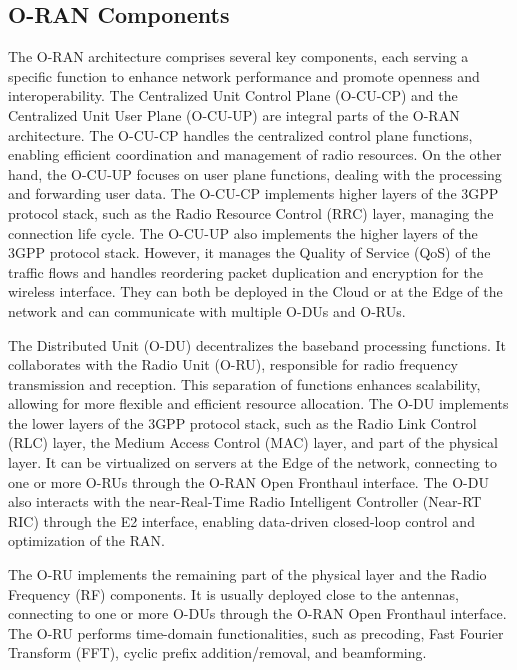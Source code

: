 \subsection{O-RAN Components}\label{sec:Components}
The O-RAN architecture comprises several key components, each serving a specific function to enhance network performance and promote openness and interoperability. The Centralized Unit Control Plane (O-CU-CP) and the Centralized Unit User Plane (O-CU-UP) are integral parts of the O-RAN architecture. The O-CU-CP handles the centralized control plane functions, enabling efficient coordination and management of radio resources. On the other hand, the O-CU-UP focuses on user plane functions, dealing with the processing and forwarding user data. The O-CU-CP implements higher layers of the 3GPP protocol stack, such as the Radio Resource Control (RRC) layer, managing the connection life cycle. The O-CU-UP also implements the higher layers of the 3GPP protocol stack. However, it manages the Quality of Service (QoS) of the traffic flows and handles reordering packet duplication and encryption for the wireless interface. They can both be deployed in the Cloud or at the Edge of the network and can communicate with multiple O-DUs and O-RUs.

The Distributed Unit (O-DU) decentralizes the baseband processing functions. It collaborates with the Radio Unit (O-RU), responsible for radio frequency transmission and reception. This separation of functions enhances scalability, allowing for more flexible and efficient resource allocation. The O-DU implements the lower layers of the 3GPP protocol stack, such as the Radio Link Control (RLC) layer, the Medium Access Control (MAC) layer, and part of the physical layer. It can be virtualized on servers at the Edge of the network, connecting to one or more O-RUs through the O-RAN Open Fronthaul interface. The O-DU also interacts with the near-Real-Time Radio Intelligent Controller (Near-RT RIC) through the E2 interface, enabling data-driven closed-loop control and optimization of the RAN.

The O-RU implements the remaining part of the physical layer and the Radio Frequency (RF) components. It is usually deployed close to the antennas, connecting to one or more O-DUs through the O-RAN Open Fronthaul interface. The O-RU performs time-domain functionalities, such as precoding, Fast Fourier Transform (FFT), cyclic prefix addition/removal, and beamforming.

